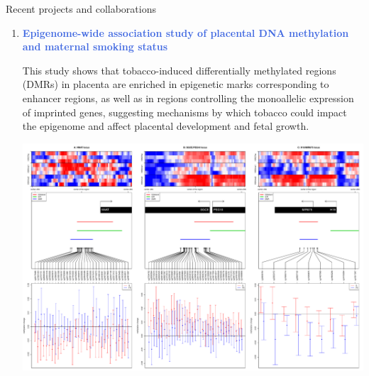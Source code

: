 \documentclass[final]{beamer}
\newlength{\twocolwid}
\begin{document}
\begin{frame}[t]
\begin{columns}[t]
\begin{column}{\twocolwid}
\begin{block}{Recent projects and collaborations}
\begin{enumerate}
\item \textcolor{RoyalBlue}{\textbf{Epigenome-wide association study of placental DNA methylation and maternal smoking status}}

{\justifying
This study shows that tobacco-induced differentially methylated regions (DMRs) in placenta are enriched in epigenetic marks corresponding to enhancer regions, as well as in regions controlling the monoallelic expression of imprinted genes, suggesting mechanisms by which tobacco could impact the epigenome and affect placental development and fetal growth.

}

{
\centering
\mbox{\includegraphics[trim = 0mm 0mm 0mm 0mm, clip, width=.99\linewidth]{figs/fig_3loci}}

}

\end{enumerate}

\end{block}






\end{column}
\end{columns}
\end{frame}
\end{document}
